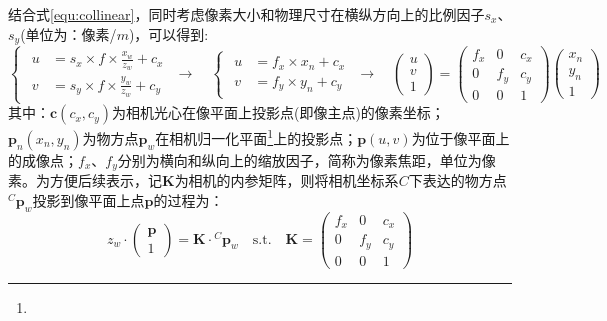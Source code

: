 结合式\ref{equ:collinear}，同时考虑像素大小和物理尺寸在横纵方向上的比例因子$s_x$、$s_y$(单位为：像素/$m$)，可以得到:
\begin{equation}
  \label{equ:cam_pinhole}
  \begin{cases}
    \begin{aligned}
      u & =s_x\times f\times\frac{x_w}{z_w}+c_x \\
      v & =s_y\times f\times\frac{y_w}{z_w}+c_y
    \end{aligned}
  \end{cases}\to\quad
  \begin{cases}
    \begin{aligned}
      u & =f_x\times x_n+c_x \\
      v & =f_y\times y_n+c_y
    \end{aligned}
  \end{cases}\to\quad
  \begin{pmatrix}
    u \\v\\1
  \end{pmatrix}=\begin{pmatrix}
    f_x & 0   & c_x \\
    0   & f_y & c_y \\
    0   & 0   & 1
  \end{pmatrix}\begin{pmatrix}
    x_n \\y_n\\1
  \end{pmatrix}
\end{equation}
其中：$\boldsymbol{c}\left( c_x,c_y\right) $为相机光心在像平面上投影点(即像主点)的像素坐标；$\boldsymbol{p}_n\left(
  x_n,y_n\right) $为物方点$\boldsymbol{p}_w$在相机归一化平面\footnote{}上的投影点；$\boldsymbol{p}\left(u,v \right) $为位于像平面上的成像点；$f_x$、$f_y$分别为横向和纵向上的缩放因子，简称为像素焦距，单位为像素。为方便后续表示，记$\boldsymbol{K}$为相机的内参矩阵，则将相机坐标系$C$下表达的物方点${^{C}\boldsymbol{p}_w}$投影到像平面上点$\boldsymbol{p}$的过程为：
\begin{equation}
  z_w\cdot\begin{pmatrix}
    \boldsymbol{p} \\1
  \end{pmatrix}=\boldsymbol{K}\cdot{^{C}\boldsymbol{p}_w}
  \quad\mathrm{s.t.}\quad
  \boldsymbol{K}=\begin{pmatrix}
    f_x & 0   & c_x \\
    0   & f_y & c_y \\
    0   & 0   & 1
  \end{pmatrix}
\end{equation}

